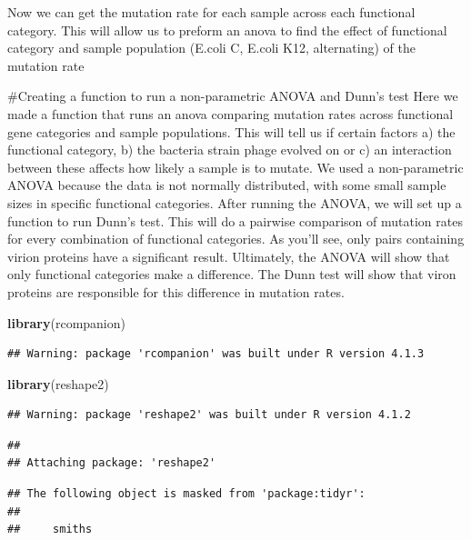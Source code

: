 \documentclass[
]{article}
\newenvironment{Shaded}{\begin{snugshade}}{\end{snugshade}}
\newcommand{\KeywordTok}[1]{\textcolor[rgb]{0.13,0.29,0.53}{\textbf{#1}}}
\newcommand{\NormalTok}[1]{#1}
\begin{document}
Now we can get the mutation rate for each sample across each functional
category. This will allow us to preform an anova to find the effect of
functional category and sample population (E.coli C, E.coli K12,
alternating) of the mutation rate

\#Creating a function to run a non-parametric ANOVA and Dunn's test Here
we made a function that runs an anova comparing mutation rates across
functional gene categories and sample populations. This will tell us if
certain factors a) the functional category, b) the bacteria strain phage
evolved on or c) an interaction between these affects how likely a
sample is to mutate. We used a non-parametric ANOVA because the data is
not normally distributed, with some small sample sizes in specific
functional categories. After running the ANOVA, we will set up a
function to run Dunn's test. This will do a pairwise comparison of
mutation rates for every combination of functional categories. As you'll
see, only pairs containing virion proteins have a significant result.
Ultimately, the ANOVA will show that only functional categories make a
difference. The Dunn test will show that viron proteins are responsible
for this difference in mutation rates.

\begin{Shaded}
\begin{Highlighting}[]
\KeywordTok{library}\NormalTok{(rcompanion)}
\end{Highlighting}
\end{Shaded}

\begin{verbatim}
## Warning: package 'rcompanion' was built under R version 4.1.3
\end{verbatim}

\begin{Shaded}
\begin{Highlighting}[]
\KeywordTok{library}\NormalTok{(reshape2)}
\end{Highlighting}
\end{Shaded}

\begin{verbatim}
## Warning: package 'reshape2' was built under R version 4.1.2
\end{verbatim}

\begin{verbatim}
## 
## Attaching package: 'reshape2'
\end{verbatim}

\begin{verbatim}
## The following object is masked from 'package:tidyr':
## 
##     smiths
\end{verbatim}
\end{document}
